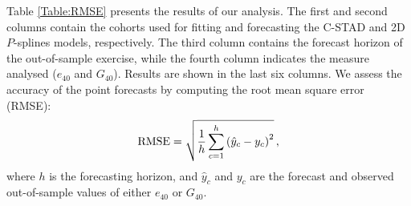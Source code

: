 \documentclass[11pt, a4paper]{article}
\begin{document}
Table \ref{Table:RMSE} presents the results of our analysis. The first and second columns contain the cohorts used for fitting and forecasting the C-STAD and 2D $P$-splines models, respectively. The third column contains the forecast horizon of the out-of-sample exercise, while the fourth column indicates the measure analysed ($e_{40}$ and $G_{40}$). Results are shown in the last six columns. We assess the accuracy of the point forecasts by computing the root mean square error (RMSE):
%
\begin{equation}\label{Eq:RMSE}
\mathrm{RMSE}=\sqrt{\frac{1}{h} \sum_{c=1}^{h} \left(\hat{y}_c-y_c\right)^2} \, , \notag
\end{equation} 
%
where $h$ is the forecasting horizon, and $\hat{y}_c$ and $y_c$ are the forecast and observed out-of-sample values of either $e_{40}$ or $G_{40}$. 
\end{document}
